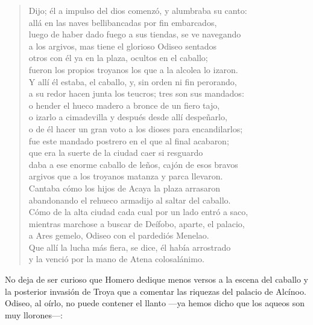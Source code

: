 \begin{verse}
Dijo; él a impulso del dios comenzó, y alumbraba su canto:\\
allá en las naves bellibancadas por fin embarcados,\\
luego de haber dado fuego a sus tiendas, se ve navegando\\
a los argivos, mas tiene el glorioso Odiseo sentados\\
otros con él ya en la plaza, ocultos en el caballo;\\
fueron los propios troyanos los que a la alcolea lo izaron.\\
Y allí él estaba, el caballo, y, sin orden ni fin perorando,\\
a su redor hacen junta los teucros; tres son sus mandados:\\
o hender el hueco madero a bronce de un fiero tajo,\\
o izarlo a cimadevilla y después desde allí despeñarlo,\\
o de él hacer un gran voto a los dioses para encandilarlos;\\
fue este mandado postrero en el que al final acabaron;\\
que era la suerte de la ciudad caer si resguardo\\
daba a ese enorme caballo de leños, cajón de esos bravos\\
argivos que a los troyanos matanza y parca llevaron.\\
Cantaba cómo los hijos de Acaya la plaza arrasaron\\
abandonando el rehueco armadijo al saltar del caballo.\\
Cómo de la alta ciudad cada cual por un lado entró a saco,\\
mientras marchose a buscar de Deífobo, aparte, el palacio,\\
a Ares gemelo, Odiseo con el pardediós Menelao.\\
Que allí la lucha más fiera, se dice, él había arrostrado\\
y la venció por la mano de Atena colosalánimo.
\end{verse}

No deja de ser curioso que Homero dedique menos versos a la escena del caballo y la posterior invasión de Troya que a comentar las riquezas del palacio de Alcínoo. Odiseo, al oírlo, no puede contener el llanto ---ya hemos dicho que los aqueos son muy llorones---:

